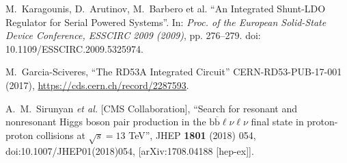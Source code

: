 \documentclass[a4paper,12pt,italian]{article}
\begin{document}
\begin{thebibliography}{1}

 M.~Karagounis, D.~Arutinov, M.~Barbero et al. ``An Integrated Shunt-LDO Regulator for Serial Powered Systems''. In: \textit{Proc. of the European Solid-State Device Conference,
ESSCIRC 2009 (2009)}, pp. 276–279. doi: 10.1109/ESSCIRC.2009.5325974.

 M.~Garcia-Sciveres, ``The RD53A Integrated Circuit''
CERN-RD53-PUB-17-001 (2017), \url{https://cds.cern.ch/record/2287593}.

  A.~M.~Sirunyan {\it et al.} [CMS Collaboration], ``Search for resonant and nonresonant Higgs boson pair production in the $ \mathrm{b}\overline{\mathrm{b}}\mathit{\ell \nu \ell \nu } $ final state in proton-proton collisions at $ \sqrt{s}=13 $ TeV'',  JHEP {\bf 1801} (2018) 054,  doi:10.1007/JHEP01(2018)054, [arXiv:1708.04188 [hep-ex]].

\end{thebibliography}
\end{document}
